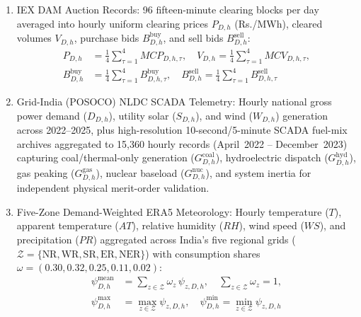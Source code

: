 \documentclass[journal,10pt,twocolumn]{IEEEtran}
\begin{document}
\begin{enumerate}
    \item IEX DAM Auction Records: 96 fifteen-minute clearing blocks per day averaged into hourly uniform clearing prices $P_{D,h}$ (Rs./MWh), cleared volumes $V_{D,h}$, purchase bids $B_{D,h}^{\text{buy}}$, and sell bids $B_{D,h}^{\text{sell}}$:
    \begin{equation}
    \begin{aligned}
    P_{D,h} &= \frac{1}{4}\sum_{\tau=1}^{4} MCP_{D,h,\tau}, \quad V_{D,h} = \frac{1}{4}\sum_{\tau=1}^{4} MCV_{D,h,\tau}, \\
    B_{D,h}^{\text{buy}} &= \frac{1}{4}\sum_{\tau=1}^{4} B_{D,h,\tau}^{\text{buy}}, \quad B_{D,h}^{\text{sell}} = \frac{1}{4}\sum_{\tau=1}^{4} B_{D,h,\tau}^{\text{sell}}
    \end{aligned}
    \label{eq:block_agg}
    \end{equation}
    \item Grid-India (POSOCO) NLDC SCADA Telemetry: Hourly national gross power demand ($D_{D,h}$), utility solar ($S_{D,h}$), and wind ($W_{D,h}$) generation across 2022--2025, plus high-resolution 10-second/5-minute SCADA fuel-mix archives aggregated to 15,360 hourly records (April~2022 -- December~2023) capturing coal/thermal-only generation ($G_{D,h}^{\text{coal}}$), hydroelectric dispatch ($G_{D,h}^{\text{hyd}}$), gas peaking ($G_{D,h}^{\text{gas}}$), nuclear baseload ($G_{D,h}^{\text{nuc}}$), and system inertia for independent physical merit-order validation.
    \item Five-Zone Demand-Weighted ERA5 Meteorology: Hourly temperature ($T$), apparent temperature ($AT$), relative humidity ($RH$), wind speed ($WS$), and precipitation ($PR$) aggregated across India's five regional grids ($\mathcal{Z} = \{\text{NR}, \text{WR}, \text{SR}, \text{ER}, \text{NER}\}$) with consumption shares $\omega = (0.30, 0.32, 0.25, 0.11, 0.02)$:
    \begin{equation}
    \begin{aligned}
    \psi_{D,h}^{\text{mean}} &= \sum_{z \in \mathcal{Z}} \omega_z \, \psi_{z,D,h}, \quad \sum_{z \in \mathcal{Z}} \omega_z = 1, \\
    \psi_{D,h}^{\text{max}} &= \max_{z \in \mathcal{Z}} \psi_{z,D,h}, \quad \psi_{D,h}^{\text{min}} = \min_{z \in \mathcal{Z}} \psi_{z,D,h}
    \end{aligned}
    \label{eq:spatial_weather}
    \end{equation}
\end{enumerate}
\end{document}
